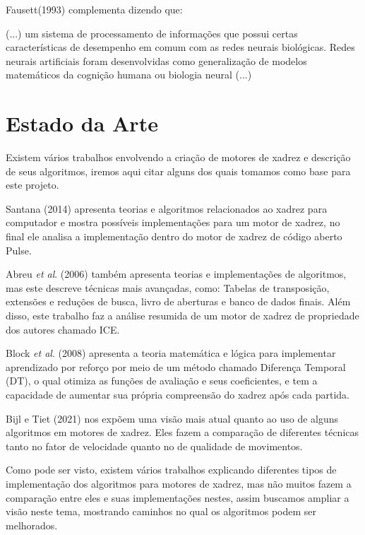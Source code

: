 Fausett(1993) complementa dizendo que:
\begin{citacao}
    (...) um sistema de processamento de informações que possui certas características de desempenho em comum com as redes
    neurais biológicas. Redes neurais artificiais foram desenvolvidas como generalização de modelos matemáticos da cognição
    humana ou biologia neural (...) \cite[p.3, tradução nossa.]{FAUSETT}
\end{citacao}

\section{Estado da Arte}

Existem vários trabalhos envolvendo a criação de motores de xadrez e descrição de seus algoritmos, iremos aqui citar
alguns dos quais tomamos como base para este projeto.

Santana (2014) apresenta teorias e algoritmos relacionados ao xadrez para computador e mostra possíveis implementações
para um motor de xadrez, no final ele analisa a implementação dentro do motor de xadrez de código aberto Pulse.

Abreu \textit{et al}. (2006) também apresenta teorias e implementações de algoritmos, mas este descreve técnicas mais avançadas,
como: Tabelas de transposição, extensões e reduções de busca, livro de aberturas e banco de dados finais. Além disso,
este trabalho faz a análise resumida de um motor de xadrez de propriedade dos autores chamado ICE.

Block \textit{et al}. (2008) apresenta a teoria matemática e lógica para implementar aprendizado por reforço por meio de um
método chamado Diferença Temporal (DT), o qual otimiza as funções de avaliação e seus coeficientes, e tem a capacidade
de aumentar sua própria compreensão do xadrez após cada partida.

Bijl e Tiet (2021) nos expõem uma visão mais atual quanto ao uso de alguns algoritmos em motores de xadrez. Eles fazem
a comparação de diferentes técnicas tanto no fator de velocidade quanto no de qualidade de movimentos.

Como pode ser visto, existem vários trabalhos explicando diferentes tipos de implementação dos algoritmos para motores de xadrez,
mas não muitos fazem a comparação entre eles e suas implementações nestes, assim buscamos ampliar a visão neste tema, mostrando
caminhos no qual os algoritmos podem ser melhorados.

\nocite{CYNTIA}
\nocite{BIJIL}
\nocite{BLOCK}
\nocite{marconi6}